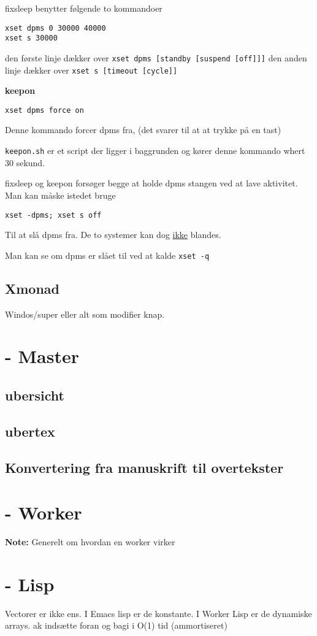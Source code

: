 \documentclass[10pt,a4paper,danish]{article}
\newcommand{\note}[1]{\begin{mdframed}[style=note]\textbf{Note:}
    #1\end{mdframed}}
\newcommand{\code}[1]{\colorbox{verbgray}{\texttt{#1}}}
\begin{document}
fixsleep benytter følgende to kommandoer
\begin{verbatim}
xset dpms 0 30000 40000
xset s 30000
\end{verbatim}
den første linje dækker over \texttt{xset dpms [standby [suspend [off]]]}
den anden linje dækker over \texttt{xset s [timeout [cycle]]}

\textbf{keepon}
\begin{verbatim}
xset dpms force on
\end{verbatim}
Denne kommando forcer dpms fra, (det svarer til at at trykke på en tast)

\texttt{keepon.sh} er et script der ligger i baggrunden og kører denne kommando
whert 30 sekund.


fixsleep og keepon forsøger begge at holde dpms stangen ved at lave aktivitet.
Man kan måske istedet bruge
\begin{verbatim}
xset -dpms; xset s off
\end{verbatim}
Til at slå dpms fra.
De to systemer kan dog \uline{ikke} blandes.

Man kan se om dpms er slået til ved at kalde \code{xset -q}
\subsection{Xmonad}
Windos/super eller alt som modifier knap.

\section{- Master}
\subsection{ubersicht}
\subsection{ubertex}
\subsection{Konvertering fra manuskrift til overtekster}
\section{- Worker}
\note{Generelt om hvordan en worker virker}
\section{- Lisp}
Vectorer er ikke ens.
I Emacs lisp er de konstante. I Worker Lisp er de dynamiske arrays. ak indsætte
foran og bagi i O(1) tid (ammortiseret)
\end{document}
